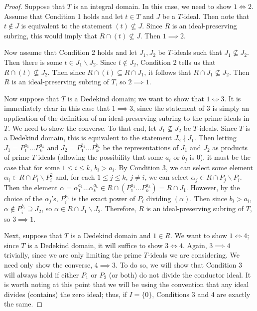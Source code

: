 \documentclass[12pt]{amsart}
\theoremstyle{definition}
\begin{document}
	\begin{proof}
		Suppose that $T$ is an integral domain. In this case, we need to show $1\iff 2$. Assume that Condition 1 holds and let $t\in T$ and $J$ be a $T$-ideal. Then note that $t\notin J$ is equivalent to the statement $(t)\nsubseteq J$. Since $R$ is an ideal-preserving subring, this would imply that $R\cap (t)\nsubseteq J$. Then $1\implies 2$.
		
		Now assume that Condition 2 holds and let $J_1, J_2$ be $T$-ideals such that $J_1\nsubseteq J_2$. Then there is some $t\in J_1\backslash J_2$. Since $t\notin J_2$, Condition 2 tells us that $R\cap (t)\nsubseteq J_2$. Then since $R\cap (t)\subseteq R\cap J_1$, it follows that $R\cap J_1\nsubseteq J_2$. Then $R$ is an ideal-preserving subring of $T$, so $2\implies 1$.
		
		Now suppose that $T$ is a Dedekind domain; we want to show that $1\iff 3$. It is immediately clear in this case that $1\implies 3$, since the statement of $3$ is simply an application of the definition of an ideal-preserving subring to the prime ideals in $T$. We need to show the converse. To that end, let $J_1\nsubseteq J_2$ be $T$-ideals. Since $T$ is a Dedekind domain, this is equivalent to the statement $J_2\nmid J_1$. Then letting $J_1=P_1^{a_1}\dots P_k^{a_k}$ and $J_2=P_1^{b_1}\dots P_k^{b_k}$ be the representations of $J_1$ and $J_2$ as products of prime $T$-ideals (allowing the possibility that some $a_i$ or $b_j$ is 0), it must be the case that for some $1\leq i\leq k$, $b_i>a_i$. By Condition 3, we can select some element $\alpha_i\in R\cap P_i\backslash P_i^2$ and, for each $1\leq j\leq k$, $j\neq i$, we can select $\alpha_j\in R\cap P_j\backslash P_i$. Then the element $\alpha=\alpha_1^{a_1}\dots \alpha_k^{a_k}\in R\cap (P_1^{a_1}\dots P_k^{a_k})=R\cap J_1$. However, by the choice of the $\alpha_j$'s, $P_i^{a_i}$ is the exact power of $P_i$ dividing $(\alpha)$. Then since $b_i>a_i$, $\alpha\notin P_i^{b_i}\supseteq J_2$, so $\alpha\in R\cap J_1\backslash J_2$. Therefore, $R$ is an ideal-preserving subring of $T$, so $3\implies 1$.
		
		Next, suppose that $T$ is a Dedekind domain and $1\in R$. We want to show $1\iff 4$; since $T$ is a Dedekind domain, it will suffice to show $3\iff 4$. Again, $3\implies 4$ trivially, since we are only limiting the prime $T$-ideals we are considering. We need only show the converse, $4\implies 3$. To do so, we will show that Condition 3 will always hold if either $P_1$ or $P_2$ (or both) do not divide the conductor ideal. It is worth noting at this point that we will be using the convention that any ideal divides (contains) the zero ideal; thus, if $I=\{0\}$, Conditions 3 and 4 are exactly the same.
		

\end{proof}
\end{document}
